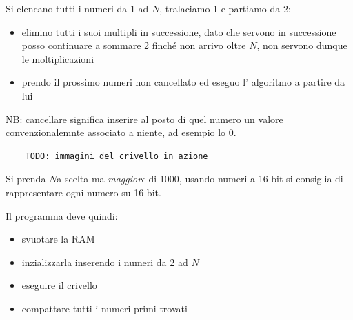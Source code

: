 Si elencano tutti i numeri da 1 ad $N$, tralaciamo 1 e partiamo da 2:
\begin{itemize}
    \item elimino tutti i suoi multipli in successione, dato che servono in successione posso continuare a sommare 2 finché non arrivo oltre $N$, non servono dunque le moltiplicazioni
    
    \item prendo il prossimo numeri non cancellato ed eseguo l' algoritmo a partire da lui
\end{itemize}

NB: cancellare significa inserire al posto di quel numero un valore convenzionalemnte associato a niente, ad esempio lo 0.

\begin{verbatim}
    TODO: immagini del crivello in azione
\end{verbatim}

Si prenda $N$a scelta ma \emph{maggiore} di 1000, usando numeri a 16 bit si consiglia di rappresentare ogni numero su 16 bit.

Il programma deve quindi:
\begin{itemize}
    \item svuotare la RAM
    \item inzializzarla inserendo i numeri da 2 ad $N$
    \item eseguire il crivello
    \item compattare tutti i numeri primi trovati
\end{itemize}





